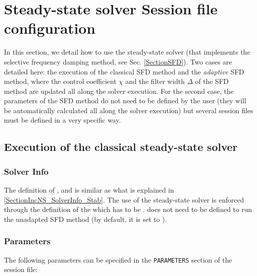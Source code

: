 \section{Steady-state solver Session file configuration}
\label{SectionSFD_XML}

In this section, we detail how to use the steady-state solver (that
implements the selective frequency damping method, see
Sec. \ref{SectionSFD}).  Two cases are detailed here: the execution of
the classical SFD method and the \textit{adaptive} SFD method, where
the control coefficient $\chi$ and the filter width $\Delta$ of the
SFD method are updated all along the solver execution. For the second
case, the parameters of the SFD method do not need to be defined by
the user (they will be automatically calculated all along the solver
execution) but several session files must be defined in a very
specific way.

\subsection{Execution of the classical steady-state solver}

\subsubsection{Solver Info}

The definition of ,  and
 is similar as what is explained in
\ref{SectionIncNS_SolverInfo_Stab}. The use of the steady-state solver
is enforced through the definition of the  which has to be
.  does not need to be
defined to run the unadapted SFD method (by default, it is set to
).

\subsubsection{Parameters}

The following parameters can be specified in the \texttt{PARAMETERS} section of the session file:


